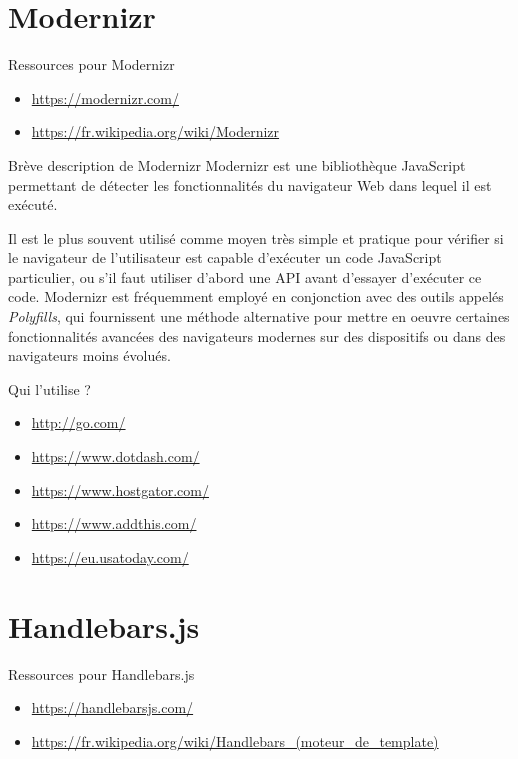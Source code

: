 \documentclass[presentation]{beamer}
\begin{document}
\section{Modernizr}
\label{sec:org57a1590}
\begin{frame}[label={sec:orgce5ea31}]{Ressources pour Modernizr}
\begin{itemize}
\item \url{https://modernizr.com/}
\item \url{https://fr.wikipedia.org/wiki/Modernizr}
\end{itemize}
\end{frame}

\begin{frame}[label={sec:orgea07932}]{Brève description de Modernizr}
Modernizr est une bibliothèque JavaScript permettant de détecter les
fonctionnalités du navigateur Web dans lequel il est exécuté.

Il est le plus souvent utilisé comme moyen très simple et pratique
pour vérifier si le navigateur de l'utilisateur est capable
d'exécuter un code JavaScript particulier, ou s'il faut utiliser
d'abord une API avant d'essayer d'exécuter ce code. Modernizr est
fréquemment employé en conjonction avec des outils appelés
\emph{Polyfills}, qui fournissent une méthode alternative pour mettre en
oeuvre certaines fonctionnalités avancées des navigateurs modernes
sur des dispositifs ou dans des navigateurs moins évolués.
\end{frame}

\begin{frame}[label={sec:orge1a67aa}]{Qui l'utilise ?}
\begin{itemize}
\item \url{http://go.com/}
\item \url{https://www.dotdash.com/}
\item \url{https://www.hostgator.com/}
\item \url{https://www.addthis.com/}
\item \url{https://eu.usatoday.com/}
\end{itemize}
\end{frame}

\section{Handlebars.js}
\label{sec:orge98088b}
\begin{frame}[label={sec:orgce8a4a1}]{Ressources pour Handlebars.js}
\begin{itemize}
\item \url{https://handlebarsjs.com/}
\item \url{https://fr.wikipedia.org/wiki/Handlebars\_(moteur\_de\_template)}
\end{itemize}
\end{frame}
\end{document}
